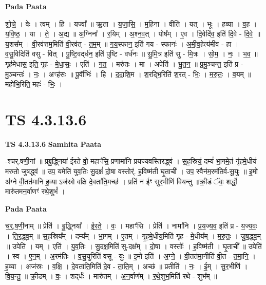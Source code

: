 \documentclass[17pt]{extarticle}
\begin{document}
\textbf{Pada Paata} \newline

शो॒चे॒ । वेः । त्वम् । हि । यज्वा᳚ ॥ ऋ॒ता । य॒जा॒सि॒ । म॒हि॒ना । वीति॑ । यत् । भूः । ह॒व्या । व॒ह॒ । य॒वि॒ष्ठ॒ । या । ते॒ । अ॒द्य ॥ अ॒ग्निना᳚ । र॒यिम् । अ॒श्न॒व॒त् । पोष᳚म् । ए॒व । दि॒वेदि॑व॒ इति॑ दि॒वे - दि॒वे॒ ॥ य॒शस᳚म् । वी॒रव॑त्तम॒मिति॑ वी॒रव॑त् - त॒म॒म् ॥ ग॒य॒स्फान॒ इति॑ गय - स्फानः॑ । अ॒मी॒व॒हेत्य॑मीव - हा । व॒सु॒विदिति॑ वसु - वित् । पु॒ष्टि॒वद्‌र्ध॑न॒ इति॑ पुष्टि - वर्ध॑नः ॥ सु॒मि॒त्र इति॑ सु - मि॒त्रः । सो॒म॒ । नः॒ । भ॒व॒ ॥ गृह॑मेधास॒ इति॒ गृह॑ - मे॒धा॒सः॒ । एति॑ । ग॒त॒ । मरु॑तः । मा । अपेति॑ । भू॒त॒न॒ ॥ प्र॒मु॒ञ्चन्त॒ इति॑ प्र - मु॒ञ्चन्तः॑ । नः॒ । अꣳह॑सः ॥ पू॒र्वीभिः॑ । हि । द॒दा॒शि॒म । श॒रद्भि॒रिति॑ श॒रत् - भिः॒ । म॒रु॒तः॒ । व॒यम् ॥ महो॑भि॒रिति॒ महः॑ - भिः॒ ।  \newline




\section*{ TS 4.3.13.6 }

\textbf{TS 4.3.13.6 } \newline
\textbf{Samhita Paata} \newline

-श्चर्.षणी॒नां ॥ प्रबु॒द्ध्निया॑ ईरते वो॒ महाꣳ॑सि॒ प्रणामा॑नि प्रयज्यवस्तिरद्ध्वं । स॒ह॒स्रियं॒ दम्यं॑ भा॒गमे॒तं गृ॑हमे॒धीयं॑ मरुतो जुषद्ध्वं ॥ उप॒ यमेति॑ युव॒तिः सु॒दक्षं॑ दो॒षा वस्तोर्॑. ह॒विष्म॑ती घृ॒ताची᳚ । उप॒ स्वैन॑म॒रम॑तिर्व-सू॒युः ॥ इ॒मो अ॑ग्ने वी॒तत॑मानि ह॒व्या ऽज॑स्रो वक्षि दे॒वता॑ति॒मच्छ॑ । प्रति॑ न ईꣳ सुर॒भीणि॑ वियन्तु ॥क्री॒डं ॅवः॒ शर्द्धो॒ मारु॑तमन॒र्वाणꣳ॑ रथे॒शुभं᳚ । \newline

\textbf{Pada Paata} \newline

च॒र्॒.ष॒णी॒नाम् ॥ प्रेति॑ । बु॒द्ध्निया᳚ । ई॒र॒ते॒ । वः॒ । महाꣳ॑सि । प्रेति॑ । नामा॑नि । प्र॒य॒ज्य॒व॒ इति॑ प्र - य॒ज्य॒वः॒ । ति॒र॒द्ध्व॒म् ॥ स॒ह॒स्रिय᳚म् । दम्य᳚म् । भा॒गम् । ए॒तम् । गृ॒ह॒मे॒धीय॒मिति॑ गृह - मे॒धीय᳚म् । म॒रु॒तः॒ । जु॒ष॒द्ध्व॒म् ॥ उपेति॑ । यम् । एति॑ । यु॒व॒तिः । सु॒दक्ष॒मिति॑ सु-दक्ष᳚म् । दो॒षा । वस्तोः᳚ । ह॒विष्म॑ती । घृ॒ताची᳚ ॥ उपेति॑ । स्व । ए॒न॒म् । अ॒रम॑तिः । व॒सू॒युरिति॑ वसू - युः ॥ इ॒मो इति॑ । अ॒ग्ने॒ । वी॒तत॑मा॒नीति॑ वी॒त - त॒मा॒नि॒ । ह॒व्या । अज॑स्रः । व॒क्षि॒ । दे॒वता॑ति॒मिति॑ दे॒व - ता॒ति॒म् । अच्छ॑ ॥ प्रतीति॑ । नः॒ । ई॒म् । सु॒र॒भीणि॑ । वि॒य॒न्तु॒ ॥ क्री॒डम् । वः॒ । शद्‌र्धः॑ । मारु॑तम् । अ॒न॒र्वाण᳚म् । र॒थे॒शुभ॒मिति॑ रथे - शुभ᳚म् ॥  \newline
\end{document}
